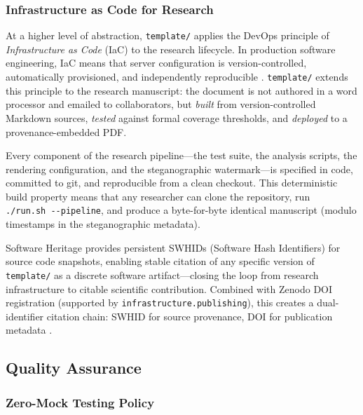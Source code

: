 \documentclass[
]{article}
\begin{document}
\subsubsection{Infrastructure as Code for
Research}\label{infrastructure-as-code-for-research}

At a higher level of abstraction, \texttt{template/} applies the DevOps
principle of \emph{Infrastructure as Code} (IaC) to the research
lifecycle. In production software engineering, IaC means that server
configuration is version-controlled, automatically provisioned, and
independently reproducible \citep{wilson2017good}. \texttt{template/}
extends this principle to the research manuscript: the document is not
authored in a word processor and emailed to collaborators, but
\emph{built} from version-controlled Markdown sources, \emph{tested}
against formal coverage thresholds, and \emph{deployed} to a
provenance-embedded PDF.

Every component of the research pipeline---the test suite, the analysis
scripts, the rendering configuration, and the steganographic
watermark---is specified in code, committed to git, and reproducible
from a clean checkout. This deterministic build property means that any
researcher can clone the repository, run
\texttt{./run.sh\ -\/-pipeline}, and produce a byte-for-byte identical
manuscript (modulo timestamps in the steganographic metadata).

Software Heritage \citep{cosmo2020softwareheritage} provides persistent
SWHIDs (Software Hash Identifiers) for source code snapshots, enabling
stable citation of any specific version of \texttt{template/} as a
discrete software artifact---closing the loop from research
infrastructure to citable scientific contribution. Combined with Zenodo
DOI registration (supported by \texttt{infrastructure.publishing}), this
creates a dual-identifier citation chain: SWHID for source provenance,
DOI for publication metadata \citep{katz2021software}.

\newpage

\subsection{Quality Assurance}\label{quality-assurance}

\subsubsection{Zero-Mock Testing Policy}\label{zero-mock-testing-policy}
\end{document}

